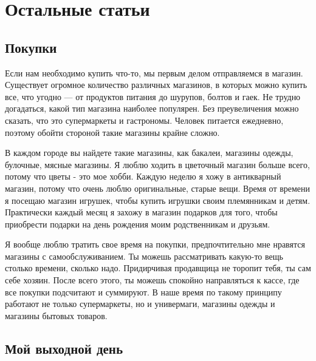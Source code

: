 \chapter{Остальные статьи}



\section{Покупки}
Если нам необходимо купить что-то, мы первым делом отправляемся в магазин. Существует огромное количество различных магазинов, в которых можно купить все, что угодно --- от продуктов питания до шурупов, болтов и гаек. Не трудно догадаться, какой тип магазина наиболее популярен. Без преувеличения можно сказать, что это супермаркеты и гастрономы. Человек питается ежедневно, поэтому обойти стороной такие магазины крайне сложно.

В каждом городе вы найдете такие магазины, как бакалеи, магазины одежды, булочные, мясные магазины. Я люблю ходить в цветочный магазин больше всего, потому что цветы - это мое хобби. Каждую неделю я хожу в антикварный магазин, потому что очень люблю оригинальные, старые вещи. Время от времени я посещаю магазин игрушек, чтобы купить игрушки своим племянникам и детям. Практически каждый месяц я захожу в магазин подарков для того, чтобы приобрести подарки на день рождения моим родственникам и друзьям.

Я вообще люблю тратить свое время на покупки, предпочтительно мне нравятся магазины с самообслуживанием. Ты можешь рассматривать какую-то вещь столько времени, сколько надо. Придирчивая продавщица не торопит тебя, ты сам себе хозяин. После всего этого, ты можешь спокойно направляться к кассе, где все покупки подсчитают и суммируют. В наше время по такому принципу работают не только супермаркеты, но и универмаги, магазины одежды и магазины бытовых товаров.






\section{Мой выходной день}

